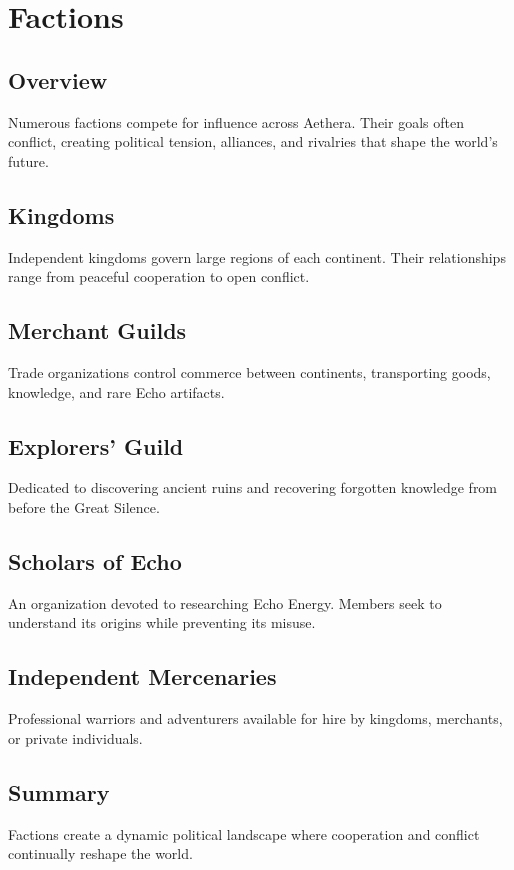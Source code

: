 \chapter{Factions}

\section{Overview}

Numerous factions compete for influence across Aethera. Their goals often conflict, creating political tension, alliances, and rivalries that shape the world's future.

\section{Kingdoms}

Independent kingdoms govern large regions of each continent. Their relationships range from peaceful cooperation to open conflict.

\section{Merchant Guilds}

Trade organizations control commerce between continents, transporting goods, knowledge, and rare Echo artifacts.

\section{Explorers' Guild}

Dedicated to discovering ancient ruins and recovering forgotten knowledge from before the Great Silence.

\section{Scholars of Echo}

An organization devoted to researching Echo Energy. Members seek to understand its origins while preventing its misuse.

\section{Independent Mercenaries}

Professional warriors and adventurers available for hire by kingdoms, merchants, or private individuals.

\section{Summary}

Factions create a dynamic political landscape where cooperation and conflict continually reshape the world.